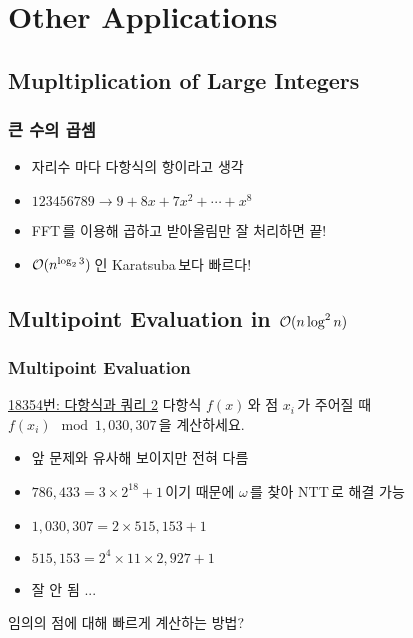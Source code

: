 \section{Other Applications}

\subsection*{Mupltiplication of Large Integers}

\begin{frame}
    \frametitle{큰 수의 곱셈}

    \begin{itemize}
        \item<1-> 자리수 마다 다항식의 항이라고 생각
        \item<2-> \(123456789 \rightarrow 9 + 8x + 7x^2 + \cdots + x^8\)
        \item<3-> FFT\,를 이용해 곱하고 받아올림만 잘 처리하면 끝!
        \item<4-> \(\mathcal{O}(n^{\log_2{3}})\)\,인 Karatsuba\,보다 빠르다!
    \end{itemize}

\end{frame}

\subsection*{Multipoint Evaluation in \texorpdfstring{\(\mathcal{O}(n \log^2 n)\)}{O(nlog2n)}}

\begin{frame}
    \frametitle{Multipoint Evaluation}

    \begin{exampleblock}{\href{https://www.acmicpc.net/problem/18354}{18354번: 다항식과 쿼리 2}}
        다항식 \(f(x)\)\,와 점 \(x_i\)\,가 주어질 때 \(f(x_i)\!\!\mod{1,030,307}\)\,을 계산하세요.
    \end{exampleblock}

    \pause

    \begin{itemize}
        \item 앞 문제와 유사해 보이지만 전혀 다름 \pause
        \item \(786,433 = 3 \times 2^{18} + 1\)\,이기 때문에 \(\omega\)\,를 찾아 NTT\,로 해결 가능 \pause
        \item \(1,030,307 = 2 \times 515,153 + 1\)
        \item \(515,153 = 2^4 \times 11 \times 2,927 + 1\) \pause
        \item 잘 안 됨 ...
    \end{itemize}

    \pause

    임의의 점에 대해 \alert{빠르게} 계산하는 방법?
\end{frame}

